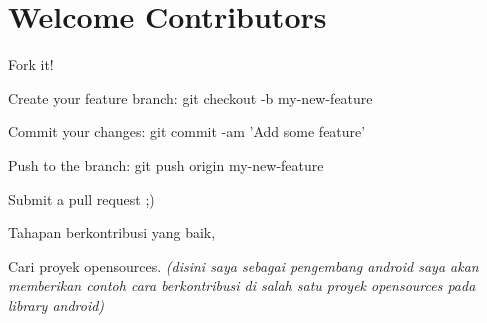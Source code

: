 \section{Welcome Contributors} \par
Fork it! \par
Create your feature branch: git checkout -b my-new-feature \par
Commit your changes: git commit -am 'Add some feature' \par
Push to the branch: git push origin my-new-feature \par
Submit a pull request ;) \par
\noindent 
Tahapan berkontribusi yang baik, \par
\noindent 
Cari proyek opensources. \textit{(disini saya sebagai pengembang android saya akan memberikan contoh cara berkontribusi di salah satu proyek opensources pada library android)} \par
\noindent 
